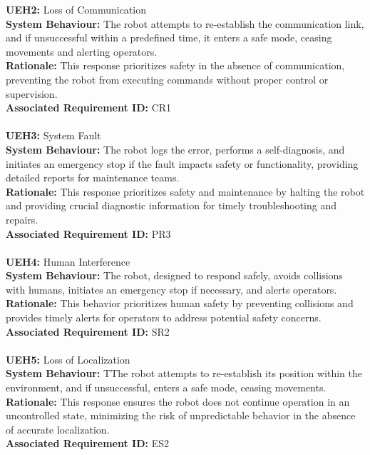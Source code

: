 \documentclass[12pt]{article}
\begin{document}
\noindent\textbf{UEH2:} Loss of Communication\\
\textbf{System Behaviour:} The robot attempts to re-establish the communication link, and if unsuccessful within a predefined time, it enters a safe mode, ceasing movements and alerting operators.\\
\textbf{Rationale:} This response prioritizes safety in the absence of communication, preventing the robot from executing commands without proper control or supervision.\\
\textbf{Associated Requirement ID:} CR1\\\\

\noindent\textbf{UEH3:} System Fault\\
\textbf{System Behaviour:} The robot logs the error, performs a self-diagnosis, and initiates an emergency stop if the fault impacts safety or functionality, providing detailed reports for maintenance teams.\\
\textbf{Rationale:} This response prioritizes safety and maintenance by halting the robot and providing crucial diagnostic information for timely troubleshooting and repairs.\\
\textbf{Associated Requirement ID:} PR3\\\\

\noindent\textbf{UEH4:} Human Interference\\
\textbf{System Behaviour:} The robot, designed to respond safely, avoids collisions with humans, initiates an emergency stop if necessary, and alerts operators.\\
\textbf{Rationale:} This behavior prioritizes human safety by preventing collisions and provides timely alerts for operators to address potential safety concerns.\\
\textbf{Associated Requirement ID:} SR2\\\\

\noindent\textbf{UEH5:} Loss of Localization\\
\textbf{System Behaviour:} TThe robot attempts to re-establish its position within the environment, and if unsuccessful, enters a safe mode, ceasing movements.\\
\textbf{Rationale:} This response ensures the robot does not continue operation in an uncontrolled state, minimizing the risk of unpredictable behavior in the absence of accurate localization.\\
\textbf{Associated Requirement ID:} ES2\\\\
\end{document}
